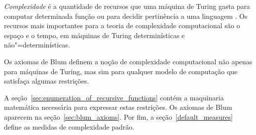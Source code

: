 \emph{Complexidade} é a quantidade de recursos
que uma máquina de Turing gasta
para computar determinada função
ou para decidir pertinência a uma linguagem
\cite[p.~285]{HopcroftUllman1979}.
Os recursos mais importantes para a teoria de complexidade computacional
são o espaço e o tempo,
em máquinas de Turing determinísticas e não"=determinísticas.

Os axiomas de Blum definem a noção de complexidade computacional
não apenas para máquinas de Turing,
mas sim para qualquer modelo de computação que satisfaça algumas restrições.

A seção~\ref{sec:enumeration_of_recursive_functions}
contém a maquinaria matemática necessária para expressar estas restrições.
Os axiomas de Blum aparecem na seção~\ref{sec:blum_axioms}.
Por fim, a seção~\ref{default_measures}
define as medidas de complexidade padrão.
